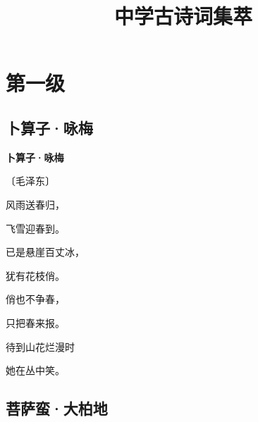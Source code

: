 \documentclass[12pt,UTF-8,openany,fontset=none]{ctexbook}
\title{\zihao{0} \bfseries 中学古诗词集萃}
\author{}
\date{}
\begin{document}
\maketitle
\tableofcontents
\newpage

\chapter{第一级}
\clearpage

\section{卜算子·咏梅}


\begin{center}
    {\bfseries 卜算子·咏梅}

    \vspace{18pt}

    \begin{large}\xuwen
        〔毛泽东〕
    \end{large}

\end{center}

    \vspace{18pt}  %

\begin{center}
    \begin{Large}

        风雨送春归，

        飞雪迎春到。

        已是悬崖百丈冰，

        犹有花枝俏。

        \vspace{18pt}  %

        俏也不争春，

        只把春来报。

        待到山花烂漫时

        她在丛中笑。

    \end{Large}

\end{center}

\vspace{8pt}
\clearpage

\section{菩萨蛮·大柏地}
\end{document}
